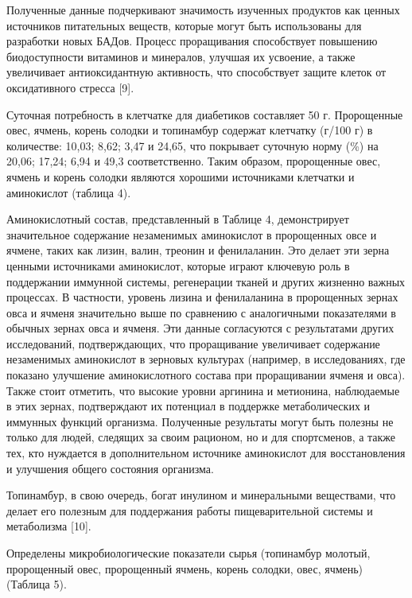 \begin{multicols}{2}

Полученные данные подчеркивают значимость изученных продуктов как ценных
источников питательных веществ, которые могут быть использованы для
разработки новых БАДов. Процесс проращивания способствует повышению
биодоступности витаминов и минералов, улучшая их усвоение, а также
увеличивает антиоксидантную активность, что способствует защите клеток
от оксидативного стресса {[}9{]}.

Суточная потребность в клетчатке для диабетиков составляет 50 г.
Пророщенные овес, ячмень, корень солодки и топинамбур содержат клетчатку
(г/100 г) в количестве: 10,03; 8,62; 3,47 и 24,65, что покрывает
суточную норму (\%) на 20,06; 17,24; 6,94 и 49,3 соответственно. Таким
образом, пророщенные овес, ячмень и корень солодки являются хорошими
источниками клетчатки и аминокислот (таблица 4).

Аминокислотный состав, представленный в Таблице 4, демонстрирует
значительное содержание незаменимых аминокислот в пророщенных овсе и
ячмене, таких как лизин, валин, треонин и фенилаланин. Это делает эти
зерна ценными источниками аминокислот, которые играют ключевую роль в
поддержании иммунной системы, регенерации тканей и других жизненно
важных процессах. В частности, уровень лизина и фенилаланина в
пророщенных зернах овса и ячменя значительно выше по сравнению с
аналогичными показателями в обычных зернах овса и ячменя. Эти данные
согласуются с результатами других исследований, подтверждающих, что
проращивание увеличивает содержание незаменимых аминокислот в зерновых
культурах (например, в исследованиях, где показано улучшение
аминокислотного состава при проращивании ячменя и овса). Также стоит
отметить, что высокие уровни аргинина и метионина, наблюдаемые в этих
зернах, подтверждают их потенциал в поддержке метаболических и иммунных
функций организма. Полученные результаты могут быть полезны не только
для людей, следящих за своим рационом, но и для спортсменов, а также
тех, кто нуждается в дополнительном источнике аминокислот для
восстановления и улучшения общего состояния организма.

Топинамбур, в свою очередь, богат инулином и минеральными веществами,
что делает его полезным для поддержания работы пищеварительной системы и
метаболизма {[}10{]}.

Определены микробиологические показатели сырья (топинамбур молотый,
пророщенный овес, пророщенный ячмень, корень солодки, овес, ячмень)
(Таблица 5).
\end{multicols}

